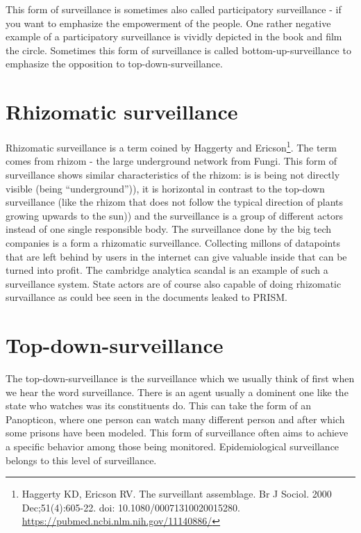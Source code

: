 \documentclass[
  letterpaper,
  DIV=11,
  numbers=noendperiod]{scrreprt}
\begin{document}
This form of surveillance is sometimes also called participatory
surveillance - if you want to emphasize the empowerment of the people.
One rather negative example of a participatory surveillance is vividly
depicted in the book and film the circle. Sometimes this form of
surveillance is called bottom-up-surveillance to emphasize the
opposition to top-down-surveillance.

\section{Rhizomatic surveillance}\label{rhizomatic-surveillance}

Rhizomatic surveillance is a term coined by Haggerty and
Ericson\footnote{Haggerty KD, Ericson RV. The surveillant assemblage. Br
  J Sociol. 2000 Dec;51(4):605-22. doi: 10.1080/00071310020015280.
  \url{https://pubmed.ncbi.nlm.nih.gov/11140886/}}. The term comes from
rhizom - the large underground network from Fungi. This form of
surveillance shows similar characteristics of the rhizom: is is being
not directly visible (being ``underground'')), it is horizontal in
contrast to the top-down surveillance (like the rhizom that does not
follow the typical direction of plants growing upwards to the sun)) and
the surveillance is a group of different actors instead of one single
responsible body. The surveillance done by the big tech companies is a
form a rhizomatic surveillance. Collecting millons of datapoints that
are left behind by users in the internet can give valuable inside that
can be turned into profit. The cambridge analytica scandal is an example
of such a surveillance system. State actors are of course also capable
of doing rhizomatic survaillance as could bee seen in the documents
leaked to PRISM.

\section{Top-down-surveillance}\label{top-down-surveillance}

The top-down-surveillance is the surveillance which we usually think of
first when we hear the word surveillance. There is an agent usually a
dominent one like the state who watches was its constituents do. This
can take the form of an Panopticon, where one person can watch many
different person and after which some prisons have been modeled. This
form of surveillance often aims to achieve a specific behavior among
those being monitored. Epidemiological surveillance belongs to this
level of surveillance.
\end{document}
